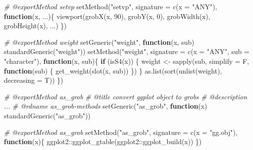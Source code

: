 \documentclass[
]{article}
\newenvironment{Shaded}{\begin{snugshade}}{\end{snugshade}}
\newcommand{\AttributeTok}[1]{\textcolor[rgb]{0.77,0.63,0.00}{#1}}
\newcommand{\CommentTok}[1]{\textcolor[rgb]{0.56,0.35,0.01}{\textit{#1}}}
\newcommand{\ControlFlowTok}[1]{\textcolor[rgb]{0.13,0.29,0.53}{\textbf{#1}}}
\newcommand{\DecValTok}[1]{\textcolor[rgb]{0.00,0.00,0.81}{#1}}
\newcommand{\FunctionTok}[1]{\textcolor[rgb]{0.00,0.00,0.00}{#1}}
\newcommand{\NormalTok}[1]{#1}
\newcommand{\OtherTok}[1]{\textcolor[rgb]{0.56,0.35,0.01}{#1}}
\newcommand{\SpecialCharTok}[1]{\textcolor[rgb]{0.00,0.00,0.00}{#1}}
\newcommand{\StringTok}[1]{\textcolor[rgb]{0.31,0.60,0.02}{#1}}
\begin{document}
\begin{Shaded}
\begin{Highlighting}[]
\CommentTok{\#\textquotesingle{} @exportMethod setvp}
\FunctionTok{setMethod}\NormalTok{(}\StringTok{"setvp"}\NormalTok{, }
  \AttributeTok{signature =} \FunctionTok{c}\NormalTok{(}\AttributeTok{x =} \StringTok{"ANY"}\NormalTok{),}
  \ControlFlowTok{function}\NormalTok{(x, ...)\{}
    \FunctionTok{viewport}\NormalTok{(}\FunctionTok{grobX}\NormalTok{(x, }\DecValTok{90}\NormalTok{), }\FunctionTok{grobY}\NormalTok{(x, }\DecValTok{0}\NormalTok{),}
      \FunctionTok{grobWidth}\NormalTok{(x), }\FunctionTok{grobHeight}\NormalTok{(x), ...)}
\NormalTok{  \})}

\CommentTok{\#\textquotesingle{} @exportMethod weight}
\FunctionTok{setGeneric}\NormalTok{(}\StringTok{"weight"}\NormalTok{, }
  \ControlFlowTok{function}\NormalTok{(x, sub) }\FunctionTok{standardGeneric}\NormalTok{(}\StringTok{"weight"}\NormalTok{))}
\FunctionTok{setMethod}\NormalTok{(}\StringTok{"weight"}\NormalTok{, }
  \AttributeTok{signature =} \FunctionTok{c}\NormalTok{(}\AttributeTok{x =} \StringTok{"ANY"}\NormalTok{, }\AttributeTok{sub =} \StringTok{"character"}\NormalTok{),}
  \ControlFlowTok{function}\NormalTok{(x, sub)\{}
    \ControlFlowTok{if}\NormalTok{ (}\FunctionTok{isS4}\NormalTok{(x)) \{}
\NormalTok{      weight }\OtherTok{\textless{}{-}}
        \FunctionTok{sapply}\NormalTok{(sub, }\AttributeTok{simplify =}\NormalTok{ F, }\ControlFlowTok{function}\NormalTok{(sub) \{}
          \FunctionTok{get\_weight}\NormalTok{(}\FunctionTok{slot}\NormalTok{(x, sub))}
\NormalTok{      \})}
\NormalTok{    \}}
    \FunctionTok{as.list}\NormalTok{(}\FunctionTok{sort}\NormalTok{(}\FunctionTok{unlist}\NormalTok{(weight), }\AttributeTok{decreasing =}\NormalTok{ T))}
\NormalTok{  \})}

\CommentTok{\#\textquotesingle{} @exportMethod as\_grob}
\CommentTok{\#\textquotesingle{} @title convert \textquotesingle{}ggplot\textquotesingle{} object to \textquotesingle{}grobs\textquotesingle{}}
\CommentTok{\#\textquotesingle{} @description ...}
\CommentTok{\#\textquotesingle{} @rdname as\_grob{-}methods}
\FunctionTok{setGeneric}\NormalTok{(}\StringTok{"as\_grob"}\NormalTok{,}
  \ControlFlowTok{function}\NormalTok{(x) }\FunctionTok{standardGeneric}\NormalTok{(}\StringTok{"as\_grob"}\NormalTok{))}

\CommentTok{\#\textquotesingle{} @exportMethod as\_grob}
\FunctionTok{setMethod}\NormalTok{(}\StringTok{"as\_grob"}\NormalTok{, }
  \AttributeTok{signature =} \FunctionTok{c}\NormalTok{(}\AttributeTok{x =} \StringTok{"gg.obj"}\NormalTok{),}
  \ControlFlowTok{function}\NormalTok{(x)\{}
\NormalTok{    ggplot2}\SpecialCharTok{::}\FunctionTok{ggplot\_gtable}\NormalTok{(ggplot2}\SpecialCharTok{::}\FunctionTok{ggplot\_build}\NormalTok{(x))}
\NormalTok{  \})}


\end{Highlighting}
\end{Shaded}
\end{document}

